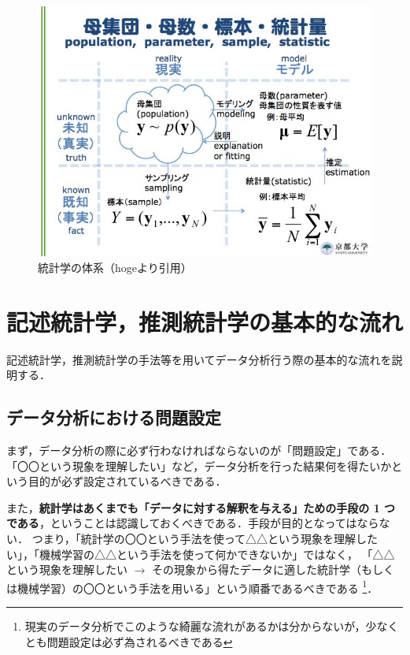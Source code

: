 \begin{figure}[H]
  \begin{center}
    \includegraphics[width=15cm]{images/statistics_map.jpeg}
    \caption{統計学の体系（hogeより引用）}
  \end{center}
\end{figure}

\section{記述統計学，推測統計学の基本的な流れ}

記述統計学，推測統計学の手法等を用いてデータ分析行う際の基本的な流れを説明する．

\subsection{データ分析における問題設定} %
\label{sub:データ分析における問題設定}

まず，データ分析の際に必ず行わなければならないのが「問題設定」である．
「〇〇という現象を理解したい」など，データ分析を行った結果何を得たいかという目的が必ず設定されているべきである．

また，\textbf{統計学はあくまでも「データに対する解釈を与える」ための手段の 1 つである}，ということは認識しておくべきである．手段が目的となってはならない．
つまり，「統計学の〇〇という手法を使って△△という現象を理解したい」，「機械学習の△△という手法を使って何かできないか」ではなく，
「△△という現象を理解したい $\rightarrow$ その現象から得たデータに適した統計学（もしくは機械学習）の〇〇という手法を用いる」という順番であるべきである
\footnote{現実のデータ分析でこのような綺麗な流れがあるかは分からないが，少なくとも問題設定は必ず為されるべきである}．\\

